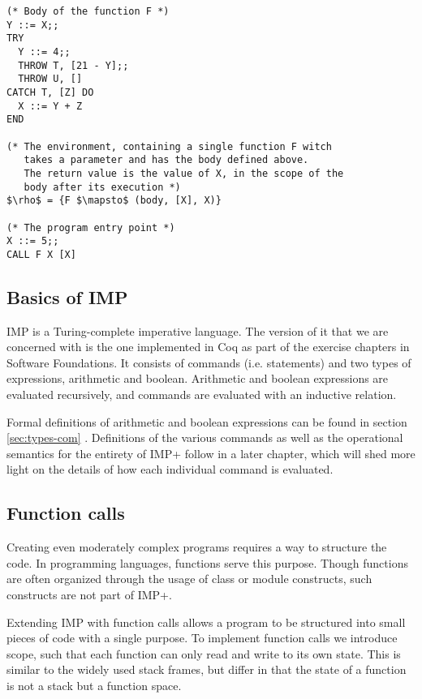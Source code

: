 \begin{lstlisting}[mathescape=true,keepspaces=true,label=lst:imp-plus-ex,caption=A program written in IMP+ demonstrating assignment and throw/catch.]
(* Body of the function F *)
Y ::= X;;
TRY
  Y ::= 4;;
  THROW T, [21 - Y];;
  THROW U, []
CATCH T, [Z] DO
  X ::= Y + Z
END

(* The environment, containing a single function F witch
   takes a parameter and has the body defined above.
   The return value is the value of X, in the scope of the 
   body after its execution *)
$\rho$ = {F $\mapsto$ (body, [X], X)}

(* The program entry point *)
X ::= 5;;
CALL F X [X]
\end{lstlisting}

\subsection{Basics of IMP}
IMP is a Turing-complete imperative language. The version of it that we are concerned with is the one implemented in Coq as part of the exercise chapters in Software Foundations. It consists of commands (i.e. statements) and two types of expressions, arithmetic and boolean. Arithmetic and boolean expressions are evaluated recursively, and commands are evaluated with an inductive relation.

Formal definitions of arithmetic and boolean expressions can be found in section \ref{sec:types-com} . Definitions of the various commands as well as the operational semantics for the entirety of IMP+ follow in a later chapter, which will shed more light on the details of how each individual command is evaluated.

\subsection{Function calls}

Creating even moderately complex programs requires a way to structure the code. In programming languages, functions serve this purpose. Though functions are often organized through the usage of class or module constructs, such constructs are not part of IMP+.

Extending IMP with function calls allows a program to be structured into small pieces of code with a single purpose. To implement function calls we introduce scope, such that each function can only read and write to its own state. This is similar to the widely used stack frames, but differ in that the state of a function is not a stack but a function space.


